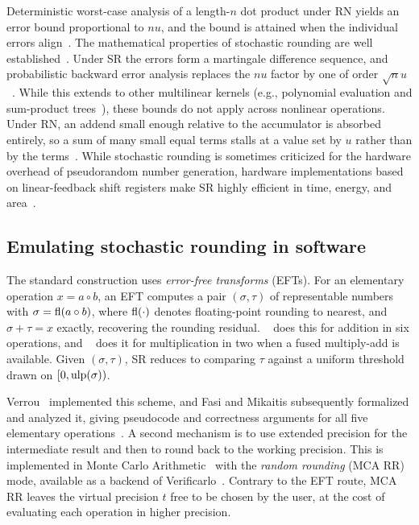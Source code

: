 Deterministic worst-case analysis of a length-$n$ dot product under RN yields
an error bound proportional to $nu$, and the bound is attained when the
individual errors align~\citep{higham2002accuracy}.
The mathematical properties of stochastic rounding are well established~\citep{croci2022stochastic}.
Under SR the errors form a martingale difference sequence, and probabilistic
backward error analysis replaces the $nu$ factor by one of order
$\sqrt{n}u$~\citep{higham2019new,connolly2021stochastic}. While this extends to
other multilinear kernels (e.g., polynomial evaluation and sum-product
trees~\citep{de2025error}), these bounds do not apply across nonlinear
operations. Under RN, an addend small enough relative to
the accumulator is absorbed entirely, so a sum of many small equal terms stalls
at a value set by $u$ rather than by the terms~\citep{higham2002accuracy}.
While stochastic rounding is sometimes criticized for the hardware overhead of
pseudorandom number generation, hardware implementations based on
linear-feedback shift registers make SR highly efficient in time,
energy, and area~\citep{benali2024stochastic}.

\subsection{Emulating stochastic rounding in software}
\label{sec:background-eft}

The standard construction uses \emph{error-free transforms} (EFTs). For an
elementary operation $x = a \circ b$, an EFT computes a pair $(\sigma,\tau)$ of
representable numbers with $\sigma = \mathrm{fl}(a \circ b)$, where $\mathrm{fl}(\cdot)$ denotes
floating-point rounding to nearest, and $\sigma + \tau = x$ exactly, recovering
the rounding residual.
~\citep{dekker1971float} does this for addition in six operations,
and ~\citep{graillat2006improving} does it for multiplication in
two when a fused multiply-add is available. Given $(\sigma,\tau)$, SR reduces to
comparing $\tau$ against a uniform threshold drawn on $[0, \mathrm{ulp}(\sigma))$.

Verrou~\citep{fevotte2016verrou} implemented this scheme, and Fasi and Mikaitis
subsequently formalized and analyzed it, giving pseudocode and correctness
arguments for all five elementary operations~\citep{fasi2021algorithms}. A second
mechanism is to use extended precision for the intermediate result and then to
round back to the working precision. This is implemented in Monte Carlo
Arithmetic~\citep{parker1997monte} with the \emph{random rounding} (MCA RR) mode,
available as a backend of Verificarlo~\citep{denis2016verificarlo}. Contrary to
the EFT route, MCA RR leaves the virtual precision $t$ free to be chosen by the
user, at the cost of evaluating each operation in higher precision.

